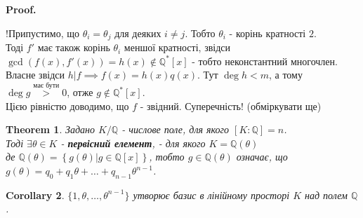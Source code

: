 \documentclass[a4paper, 14pt]{extarticle}
\makeatletter
\theoremstyle{theoremdd}
\newtheorem{theorem}{Theorem}[subsection]
\theoremstyle{theoremdd}
\theoremstyle{theoremdd}
\theoremstyle{theoremdd}
\theoremstyle{theoremdd}
\theoremstyle{theoremdd}
\theoremstyle{theoremdd}
\theoremstyle{theoremdd}
\newtheorem{corollary}[theorem]{Corollary}
\def\qed{$\blacksquare$}
\renewenvironment{proof}[1][Proof.\\]{\par
\pushQED{\hfill \qed}%
\normalfont \topsep6\p@\@plus6\p@\relax
\trivlist
\item\relax
{\bfseries
#1\@addpunct{.}}\hspace\labelsep\ignorespaces
}{%
\popQED\endtrivlist\@endpefalse
}
\makeatother
\begin{document}
\begin{proof}
!Припустимо, що $\theta_i = \theta_j$ для деяких $i \neq j$. Тобто $\theta_i$ - корінь кратності $2$.\\
Тоді $f'$ має також корінь $\theta_i$ меншої кратності, звідси\\
$\gcd(f(x),f'(x)) = h(x) \not\in \mathbb{Q}^*[x]$ - тобто неконстантний многочлен. Власне звідси $h|f \implies f(x) = h(x)q(x)$. Тут $\deg h < m$, а тому $\deg g \overset{\text{має бути}}{>} 0$, отже $g \not\in \mathbb{Q}^*[x]$.\\
Цією рівністю доводимо, що $f$ - звідний. Суперечність! (обміркувати ще)
\end{proof}

\begin{theorem}
Задано $K/\mathbb{Q}$ - числове поле, для якого $[K:\mathbb{Q}] = n$.\\
Тоді $\exists \theta \in K$ - \textbf{первісний елемент}, - для якого $K = \mathbb{Q}(\theta)$\\
де $\mathbb{Q}(\theta) = \left\{ g(\theta) | g \in \mathbb{Q}[x] \right\}$, тобто $g \in \mathbb{Q}(\theta)$ означає, що \\
$g(\theta) = q_0 + q_1 \theta + \dots + q_{n-1} \theta^{n-1}$.
\end{theorem}

\begin{corollary}
$\{1,\theta,\dots,\theta^{n-1}\}$ утворює базис в лінійному просторі $K$ над полем $\mathbb{Q}$.
\end{corollary}
\end{document}
